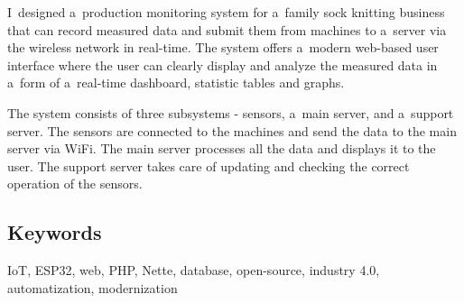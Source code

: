 \documentclass{template/socthesis}
\begin{document}
I~designed a~production monitoring system for a~family sock knitting business that can record measured data and submit them from machines to a~server via the wireless network in real-time.
The system offers a~modern web-based user interface where the user can clearly display and analyze the measured data in a~form of a~real-time dashboard, statistic tables and graphs.

The system consists of three subsystems - sensors, a~main server, and a~support server.
The sensors are connected to the machines and send the data to the main server via WiFi. 
The main server processes all the data and displays it to the user. 
The support server takes care of updating and checking the correct operation of the sensors. 

\subsection*{Keywords}
IoT, ESP32, web, PHP, Nette, database, open-source, industry 4.0, automatization, modernization

\newpage
\pagestyle{plain}

\tableofcontents %


\pagestyle{plain}
\listoffigures
{}

\pagestyle{plain}
\listoftables
{}

\setcounter{figure}{0}
\setcounter{table}{0}
\newpage



% 
\end{document}
